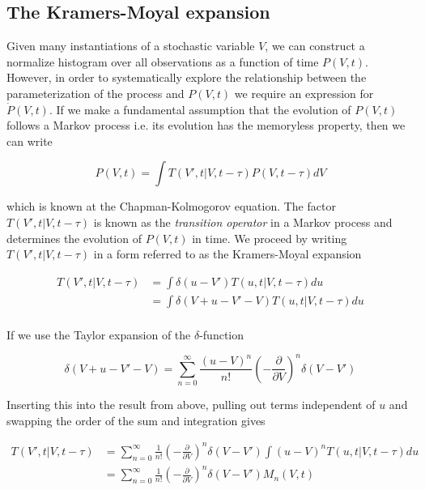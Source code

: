 \documentclass{ucetd}
\begin{document}
\subsection{The Kramers-Moyal expansion}

Given many instantiations of a stochastic variable $V$, we can construct a normalize histogram over all observations as a function of time $P(V,t)$. However, in order to systematically explore the relationship between the parameterization of the process and $P(V,t)$ we require an expression for $\dot{P}(V,t)$. If we make a fundamental assumption that the evolution of $P(V,t)$ follows a Markov process i.e. its evolution has the memoryless property, then we can write

\begin{equation}
P(V, t) = \int T(V', t | V, t-\tau)P(V, t-\tau)dV
\end{equation} 

which is known at the Chapman-Kolmogorov equation. The factor $T(V', t | V, t-\tau)$ is known as the \emph{transition operator} in a Markov process and determines the evolution of $P(V,t)$ in time. We proceed by writing $T(V', t | V, t-\tau)$ in a form referred to as the Kramers-Moyal expansion

\begin{align*}
T(V', t | V, t-\tau) &= \int \delta(u-V')T(u, t | V, t-\tau)du\\
&= \int \delta(V+u-V'-V)T(u, t | V, t-\tau)du\\
\end{align*} 

If we use the Taylor expansion of the $\delta$-function 

\begin{equation*}
\delta(V+u-V'-V) = \sum_{n=0}^{\infty} \frac{(u-V)^{n}}{n!}\left(-\frac{\partial}{\partial V}\right)^{n}\delta(V-V')
\end{equation*}

Inserting this into the result from above, pulling out terms independent of $u$ and swapping the order of the sum and integration gives

\begin{align}
T(V', t | V, t-\tau) &= \sum_{n=0}^{\infty} \frac{1}{n!}\left(-\frac{\partial}{\partial V}\right)^{n}\delta(V-V')\int(u-V)^{n}T(u, t | V, t-\tau)du\\
&= \sum_{n=0}^{\infty} \frac{1}{n!}\left(-\frac{\partial}{\partial V}\right)^{n}\delta(V-V')M_{n}(V,t)
\end{align} 
\end{document}
